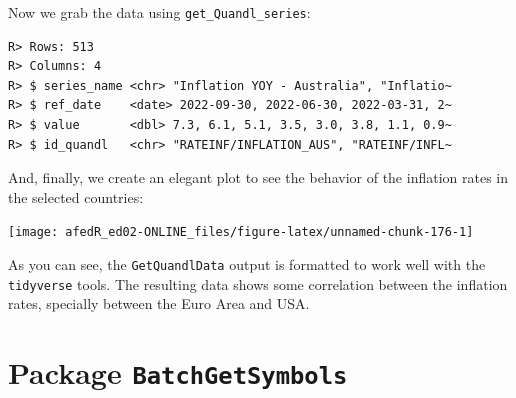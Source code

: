 \documentclass[
  12pt,
]{book}
\newenvironment{Shaded}{\begin{snugshade}}{\end{snugshade}}
\newcommand{\AttributeTok}[1]{\textcolor[rgb]{0.61,0.61,0.61}{#1}}
\newcommand{\FunctionTok}[1]{\textcolor[rgb]{0,0,0}{#1}}
\newcommand{\NormalTok}[1]{#1}
\newcommand{\OtherTok}[1]{\textcolor[rgb]{0.37,0.37,0.37}{#1}}
\newcommand{\SpecialCharTok}[1]{\textcolor[rgb]{0,0,0}{#1}}
\newcommand{\StringTok}[1]{\textcolor[rgb]{0.5,0.5,0.5}{#1}}
\begin{document}
Now we grab the data using \texttt{get\_Quandl\_series}:

\begin{Shaded}
\end{Shaded}

\begin{verbatim}
R> Rows: 513
R> Columns: 4
R> $ series_name <chr> "Inflation YOY - Australia", "Inflatio~
R> $ ref_date    <date> 2022-09-30, 2022-06-30, 2022-03-31, 2~
R> $ value       <dbl> 7.3, 6.1, 5.1, 3.5, 3.0, 3.8, 1.1, 0.9~
R> $ id_quandl   <chr> "RATEINF/INFLATION_AUS", "RATEINF/INFL~
\end{verbatim}

And, finally, we create an elegant plot to see the behavior of the inflation rates in the selected countries:

\begin{center}\texttt{[image: afedR\_ed02-ONLINE\_files/figure-latex/unnamed-chunk-176-1]} \end{center}

As you can see, the \texttt{GetQuandlData} output is formatted to work well with the \texttt{tidyverse} tools. The resulting data shows some correlation between the inflation rates, specially between the Euro Area and USA.

\hypertarget{package-batchgetsymbols}{%
\section{\texorpdfstring{Package \texttt{BatchGetSymbols}}{Package BatchGetSymbols}}\label{package-batchgetsymbols}}
\end{document}
